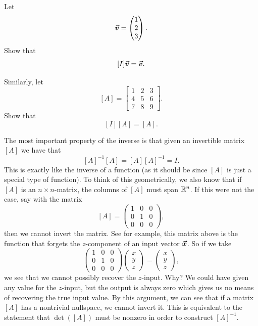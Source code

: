         \begin{exercise}
        Let
        \[
        \boldsymbol{\boldsymbol{\vec{v}}}=\begin{pmatrix} 1 \\ 2 \\ 3 \end{pmatrix}.
        \]
        Show that
        \[
        [I]\boldsymbol{\boldsymbol{\vec{v}}}=\boldsymbol{\boldsymbol{\vec{v}}}.
        \]
        
        Similarly, let
        \[
        [A]= \begin{bmatrix}
        1 & 2 & 3\\
        4 & 5 & 6\\
        7 & 8 & 9
        \end{bmatrix}.
        \]
        Show that
        \[
        [I][A]=[A].
        \]
        \end{exercise}
        
        The most important property of the inverse is that given an invertible matrix $[A]$ we have that
        \[
        [A]^{-1}[A]=[A][A]^{-1}=I.
        \]
        This is exactly like the inverse of a function (as it should be since $[A]$ is just a special type of function).  To think of this geometrically, we also know that if $[A]$ is an $n\times n$-matrix, the columns of $[A]$ must span $\mathbb{R}^n$.  If this were not the case, say with the matrix
        \[
        [A]=\begin{pmatrix} 1 & 0 & 0 \\ 0 & 1 & 0 \\ 0 & 0 & 0 \end{pmatrix},
        \]
        then we cannot invert the matrix.  See for example, this matrix above is the function that forgets the $z$-component of an input vector $\boldsymbol{\vec{x}}$. So if we take
        \[
        \begin{pmatrix} 1 & 0 & 0 \\ 0 & 1 & 0 \\ 0 & 0 & 0 \end{pmatrix} \begin{pmatrix} x \\ y \\ z \end{pmatrix} = \begin{pmatrix} x \\ y \\ z \end{pmatrix},
        \]
        we see that we cannot possibly recover the $z$-input. Why? We could have given any value for the $z$-input, but the output is always zero which gives us no means of recovering the true input value.  By this argument, we can see that if a matrix $[A]$ has a nontrivial nullspace, we cannot invert it.  This is equivalent to the statement that $\det([A])$ must be nonzero in order to construct $[A]^{-1}$.
        
